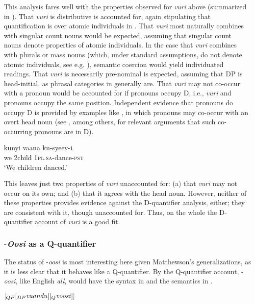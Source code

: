 \documentclass[output=paper]{langsci/langscibook}
\begin{document}
This analysis fares well with the properties observed for \textit{vuri} above (summarized in ). That \textit{vuri} is distributive is accounted for, again stipulating that quantification is over atomic individuals in . That \textit{vuri} most naturally combines with singular count nouns would be expected, assuming that singular count nouns denote properties of atomic individuals. In the case that \textit{vuri} combines with plurals or mass nouns (which, under standard assumptions, do not denote atomic individuals, see e.g. \citealt{Link1983}), semantic coercion would yield individuated readings. That \textit{vuri} is necessarily pre-nominal is expected, assuming that DP is head-initial, as phrasal categories in  generally are. That \textit{vuri} may not co-occur with a pronoun would be accounted for if pronouns occupy D, i.e., \textit{vuri} and pronouns occupy the same position. Independent evidence that  pronouns do occupy D is provided by examples like , in which pronouns may co-occur with an overt head noun (see \citealt{Postal1966}, among others, for relevant arguments that such co-occurring pronouns are in D).

\ea\label{ex:landman:20}
\gll kunyi  vaana    ku-syeev-i.\\
     we  2child    1\textsc{pl}.\textsc{sa}-dance-\textsc{pst}  \\
\glt ‘We children danced.’
\z

  This leaves just two properties of \textit{vuri} unaccounted for: (a) that \textit{vuri} may not occur on its own; and (b) that it agrees with the head noun. However, neither of these properties provides evidence against the D-quantifier analysis, either; they are consistent with it, though unaccounted for. Thus, on the whole the D-quantifier account of \textit{vuri} is a good fit.

\subsubsection{-\textit{Oosi} as a Q-quantifier}

The status of -\textit{oosi} is most interesting here given Matthewson's generalizations, as it is less clear that it behaves like a Q-quantifier. By the Q-quantifier account, -\textit{oosi}, like English \textit{all}, would have the syntax in  and the semantics in .

\ea\label{ex:landman:21}
$[_{QP} [_{ DP} \text{\textit{vaandu}}] [_{Q} \text{\textit{voosi}}]]$
\z
\end{document}

